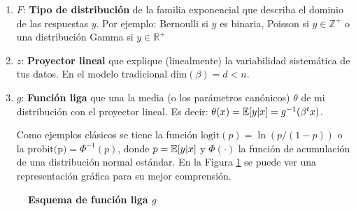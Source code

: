 \documentclass[../Main/Main.tex]{subfiles}
\begin{document}
\begin{enumerate}
	\item $F$: \textbf{Tipo de distribución} de la familia exponencial que describa el dominio de las respuestas $y$. Por ejemplo: Bernoulli si $y$ es binaria, Poisson si $y \in \mathbb{Z}^+$ o una distribución Gamma si $y \in \mathbb{R}^+$
	\item $z$: \textbf{Proyector lineal} que explique (linealmente) la variabilidad sistemática de tus datos. En el modelo tradicional $\text{dim}(\beta) = d < n.$
	\item $g$: \textbf{Función liga} que una la media (o los parámetros canónicos) $\theta$ de mi distribución con el proyector lineal. Es decir: $\theta(x) = \mathbb{E}[y|x] = g^{-1}(\beta^tx)$. 
	
	Como ejemplos clásicos se tiene la función $\text{logit}(p) = \ln(p/(1-p))$ o la $\text{probit(p)} = \Phi^{-1}(p)$, donde $p = \mathbb{E}[y|x]$ y $\Phi(\cdot)$ la función de acumulación de una distribución normal estándar. En la Figura \ref{fig:DiagramaFuncLiga} se puede ver una representación gráfica para su mejor comprensión.
\end{enumerate}

\begin{figure}[h]
\centering
{}
\caption{\textbf{Esquema de función liga $g$}}
\label{fig:DiagramaFuncLiga}
\end{figure}
\end{document}
